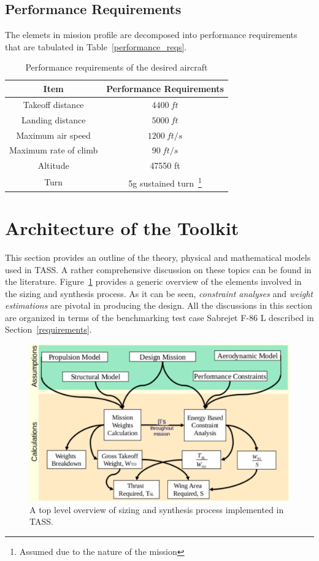 \documentclass[pdftex,11pt,letter]{article}
\begin{document}
\subsection{Performance Requirements}
The elemets in mission profile are decomposed into performance requirements that are tabulated in Table~\ref{performance_reqs}.

\begin{table}[h]
\caption{Performance requirements of the desired aircraft}
\centering 
\begin{tabular}{c | c}
\hline\hline
Item  & Performance Requirements \\
\hline\hline
Takeoff distance 	& $4400~ft$ \\
Landing distance        & $5000~ft$ \\
Maximum air speed       & $1200~ft/s$ \\
Maximum rate of climb   & $90~ft/s$\\
Altitude                & 47550 ft\\
Turn                    & 5g sustained turn~\footnote{Assumed due to the nature of the mission}\\
\hline\hline
\end{tabular}
\label{tab:performance_reqs}
\end{table}


\section{Architecture of the Toolkit}\label{theory}
This section provides an outline of the theory, physical and mathematical models used in TASS. A rather comprehensive discussion on these topics can be found in the literature\cite{MattinglyText,NicolaiText,FieldingText,HoweText,RaymerText}. Figure~\ref{fig:sizing_overview} provides a generic overview of the elements involved in the sizing and synthesis process. As it can be seen, \emph{constraint analyses} and \emph{weight estimations} are pivotal in producing the design.  All the discussions in this section are organized in terms of the benchmarking test case Sabrejet F-86 L described in Section~\ref{requirements}.

\begin{figure}[h!]
	\centering
	\includegraphics[scale=0.85]{figures/sizing_overview.pdf}
	\caption{A top level overview of sizing and synthesis process implemented in TASS\cite{MavrisNotes}.}
	\label{fig:sizing_overview}
\end{figure}
\end{document}
